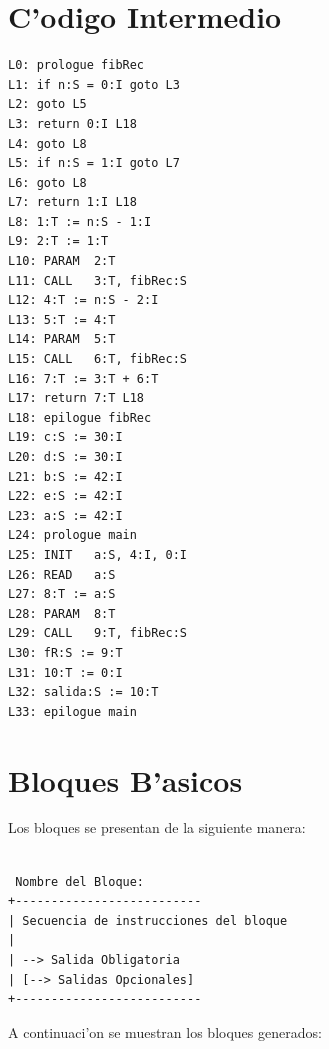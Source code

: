 \documentclass[twocolumn,12pt,letterpaper]{article}
\theoremstyle{definition} \newtheorem{definicion}{Definici\'{o}n}
\theoremstyle{plain} \newtheorem{teorema}{Teorema}
\theoremstyle{plain} \newtheorem{lema}{Lema}
\begin{document}
\section{C'odigo Intermedio}

\begin{verbatim}
L0: prologue fibRec
L1: if n:S = 0:I goto L3
L2: goto L5
L3: return 0:I L18
L4: goto L8
L5: if n:S = 1:I goto L7
L6: goto L8
L7: return 1:I L18
L8: 1:T := n:S - 1:I
L9: 2:T := 1:T
L10: PARAM  2:T
L11: CALL   3:T, fibRec:S
L12: 4:T := n:S - 2:I
L13: 5:T := 4:T
L14: PARAM  5:T
L15: CALL   6:T, fibRec:S
L16: 7:T := 3:T + 6:T
L17: return 7:T L18
L18: epilogue fibRec
L19: c:S := 30:I
L20: d:S := 30:I
L21: b:S := 42:I
L22: e:S := 42:I
L23: a:S := 42:I
L24: prologue main
L25: INIT   a:S, 4:I, 0:I
L26: READ   a:S
L27: 8:T := a:S
L28: PARAM  8:T
L29: CALL   9:T, fibRec:S
L30: fR:S := 9:T
L31: 10:T := 0:I
L32: salida:S := 10:T
L33: epilogue main
\end{verbatim}

\section{Bloques B'asicos}

Los bloques se presentan de la siguiente manera:

\begin{verbatim}

 Nombre del Bloque:
+--------------------------
| Secuencia de instrucciones del bloque
|
| --> Salida Obligatoria
| [--> Salidas Opcionales]
+--------------------------
\end{verbatim}

A continuaci'on se muestran los bloques generados:
\end{document}
